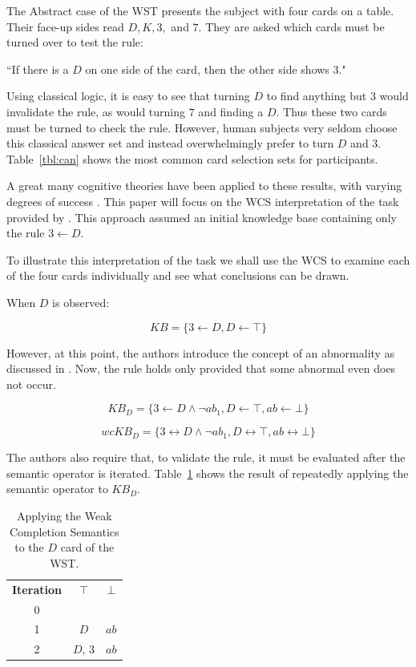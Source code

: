 \documentclass{article}
\begin{document}
The Abstract case of the WST presents the subject with four cards on a table. Their face-up sides read $D, K, 3,$ and $7$. They are asked which cards must be turned over to test the rule:

\begin{center}
``If there is a $D$ on one side of the card, then the other side shows $3$."
\end{center} 
Using classical logic, it is easy to see that turning $D$ to find anything but $3$ would invalidate the rule, as would turning $7$ and finding a $D$. Thus these two cards must be turned to check the rule. However, human subjects very seldom choose this classical answer set and instead overwhelmingly prefer to turn $D$ and $3$. Table~\ref{tbl:can} shows the most common card selection sets for participants.

A great many cognitive theories have been applied to these results, with varying degrees of success \cite{ragni2017formal}. This paper will focus on the WCS interpretation of the task provided by \citep{ragni2017wason}. This approach assumed an initial knowledge base containing only the rule $3 \leftarrow D$.

To illustrate this interpretation of the task we shall use the WCS to examine each of the four cards individually and see what conclusions can be drawn.

When $D$ is observed:

\[
KB = \{3 \leftarrow D, D\leftarrow \top \}
\]

However, at this point, the authors introduce the concept of an abnormality as discussed in \citep{ragni2017formal}. Now, the rule holds only provided that some abnormal even does not occur.

\[
KB_D = \{3 \leftarrow D \land \lnot ab_1, D \leftarrow \top, ab \leftarrow \bot \}
\]

\[
wcKB_D = \{3 \leftrightarrow D \land \lnot ab_1, D \leftrightarrow \top, ab \leftrightarrow \bot \}
\]

The authors also require that, to validate the rule, it must be evaluated after the semantic operator is iterated. Table~\ref{tbl:dcard} shows the result of repeatedly applying the semantic operator to $KB_D$. 

\begin{table}
\begin{center}

\begin{tabular}{ c c c }
 \textbf{Iteration} & \textbf{$\top$} & \textbf{$\bot$} \\ 
 0 &  &  \\  
 1 &  $D$ & $ab$  \\  
 2 &  $D$, $3$ & $ab$  
\end{tabular}
\caption{Applying the Weak Completion Semantics to the $D$ card of the WST.}
\label{tbl:dcard}

\end{center}
\end{table}
\end{document}
